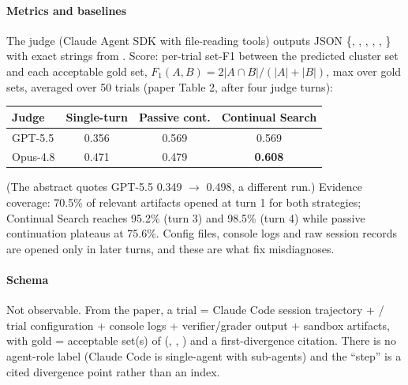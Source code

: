 \paragraph{Metrics and baselines} The judge (Claude Agent SDK with file-reading tools) outputs JSON \{, , , , , \} with exact strings from . Score: per-trial set-F1 between the predicted cluster set and each acceptable gold set, $F_1(A,B)=2|A\cap B|/(|A|+|B|)$, max over gold sets, averaged over 50 trials (paper Table 2, after four judge turns):

\begin{center}\small
\begin{tabular}{@{}lccc@{}}\toprule
Judge & Single-turn & Passive cont. & Continual Search\\\midrule
GPT-5.5 & 0.356 & 0.569 & 0.569\\
Opus-4.8 & 0.471 & 0.479 & \textbf{0.608}\\\bottomrule
\end{tabular}
\end{center}
(The abstract quotes GPT-5.5 0.349 $\to$ 0.498, a different run.) Evidence coverage: 70.5\% of relevant artifacts opened at turn 1 for both strategies; Continual Search reaches 95.2\% (turn 3) and 98.5\% (turn 4) while passive continuation plateaus at 75.6\%. Config files, console logs and raw session records are opened only in later turns, and these are what fix misdiagnoses.

\paragraph{Schema} Not observable. From the paper, a trial = Claude Code session trajectory +  / trial configuration + console logs + verifier/grader output + sandbox artifacts, with gold = acceptable set(s) of (, , ) and a first-divergence citation. There is no agent-role label (Claude Code is single-agent with sub-agents) and the ``step'' is a cited divergence point rather than an index.

